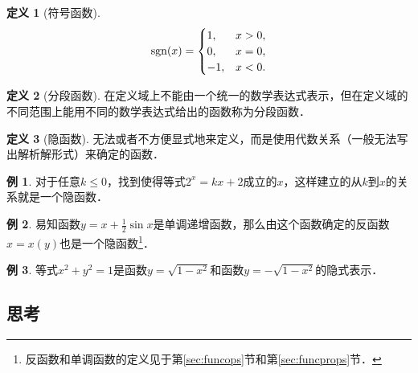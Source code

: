 \documentclass[a4paper,punct=CCT]{ctexbook}
\theoremstyle{definition}
\newtheorem*{definition*}{定义}
\newtheorem*{example*}{例}
\theoremstyle{remark}
\let\leq\leqslant
\let\le\leq
\begin{document}
\begin{definition*}[符号函数]
  \[
    \operatorname{sgn}(x) =
    \begin{cases}
      1, & x > 0, \\
      0, & x = 0, \\
      -1, & x < 0.
    \end{cases}
  \]
\end{definition*}

\begin{definition*}[分段函数]
  在定义域上不能由一个统一的数学表达式表示，但在定义域的不同范围上能用不同的数学表达式给出的函数称为分段函数．
\end{definition*}

\begin{definition*}[隐函数]
  无法或者不方便显式地来定义，而是使用代数关系（一般无法写出解析解形式）来确定的函数．
\end{definition*}

\begin{example*}
  对于任意\(k \le 0\)，找到使得等式\(2^x = kx + 2\)成立的\(x\)，这样建立的从\(k\)到\(x\)的关系就是一个隐函数．
\end{example*}

\begin{example*}
  易知函数\(y = x + \frac12 \sin x\)是单调递增函数，那么由这个函数确定的反函数\(x = x(y)\)也是一个隐函数\footnote{反函数和单调函数的定义见于第\ref{sec:funcops}节和第\ref{sec:funcprops}节．}．
\end{example*}

\begin{example*}
  等式\(x^2 + y^2 = 1\)是函数\(y = \sqrt{1 - x^2}\)和函数\(y = -\sqrt{1 - x^2}\)的隐式表示．
\end{example*}

\subsection*{思考}
\end{document}
